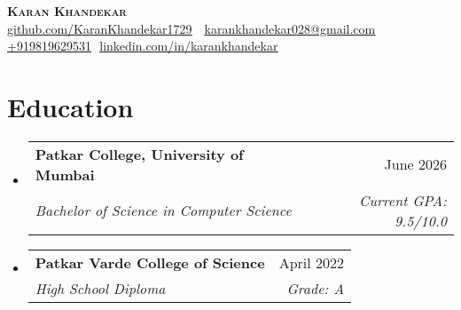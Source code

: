 \documentclass[letterpaper,11pt]{article}
\makeatletter
\newcommand{\resumeSubheading}[4]{
  \vspace{-2pt}\item
    \begin{tabular*}{0.97\textwidth}[t]{l@{\extracolsep{\fill}}r}
      \textbf{#1} & #2 \\
      \textit{\small#3} & \textit{\small #4} \\
    \end{tabular*}\vspace{-7pt}
}
\newcommand{\resumeSubHeadingListStart}{\begin{itemize}[leftmargin=0.15in, label={}]}
\newcommand{\resumeSubHeadingListEnd}{\end{itemize}}
\makeatother
\begin{document}
\begin{flushright}
  \vspace{-4pt}
\end{flushright}

\vspace{-7pt}

\begin{center}
    \textbf{\Huge \scshape Karan Khandekar} \\ \vspace{8pt}
    \small 
    \faGithub
    \href{github.com/KaranKhandekar1729}{\underline{github.com/KaranKhandekar1729}} $  $
    \faEnvelope$  $
    \href{mailto:karankhandekar028@gmail.com}
    {\underline{karankhandekar028@gmail.com}}
    \faPhone$  $
    \underline{+919819629531}
    \faLinkedin$  $
    \href{linkedin.com/in/karankhandekar}{\underline{linkedin.com/in/karankhandekar}} $  $
\end{center}

\section{Education}
  \resumeSubHeadingListStart
    \resumeSubheading
        {Patkar College, University of Mumbai}{June 2026}
        {Bachelor of Science in Computer Science}{Current GPA: 9.5/10.0}
  
    \resumeSubheading
      {Patkar Varde College of Science}{April 2022}
      {High School Diploma}{Grade: A}
      

  \resumeSubHeadingListEnd

\end{document}

